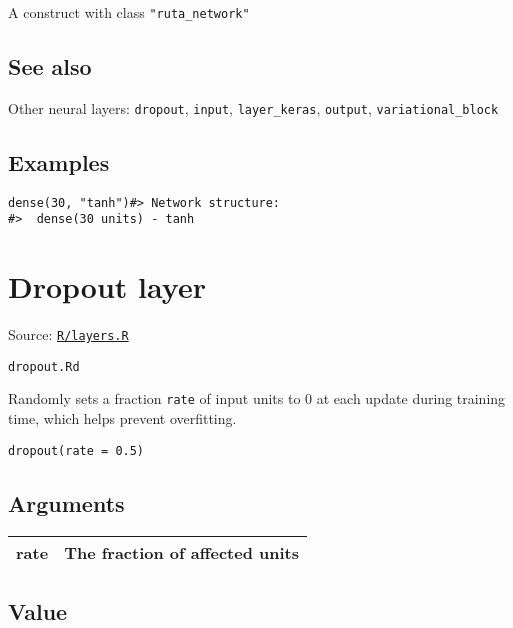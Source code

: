 A construct with class \texttt{"ruta\_network"}

\hypertarget{see-also}{\subsection{\texorpdfstring{\protect\hyperlink{see-also}{}See
also}{See also}}\label{see-also}}

Other neural layers: \texttt{dropout}, \texttt{input},
\texttt{layer\_keras}, \texttt{output}, \texttt{variational\_block}

\hypertarget{examples}{\subsection{\texorpdfstring{\protect\hyperlink{examples}{}Examples}{Examples}}\label{examples}}

\begin{verbatim}
dense(30, "tanh")#> Network structure:
#>  dense(30 units) - tanh
\end{verbatim}

\section{Dropout layer}\label{dropout-layer}

Source:
\href{https://github.com/fdavidcl/ruta/blob/master/R/layers.R}{\texttt{R/layers.R}}

\texttt{dropout.Rd}

Randomly sets a fraction \texttt{rate} of input units to 0 at each
update during training time, which helps prevent overfitting.

\begin{verbatim}
dropout(rate = 0.5)
\end{verbatim}

\hypertarget{arguments}{\subsection{\texorpdfstring{\protect\hyperlink{arguments}{}Arguments}{Arguments}}\label{arguments}}

\begin{longtable}[c]{@{}ll@{}}
\toprule
rate & The fraction of affected units\tabularnewline
\bottomrule
\end{longtable}

\hypertarget{value}{\subsection{\texorpdfstring{\protect\hyperlink{value}{}Value}{Value}}\label{value}}

